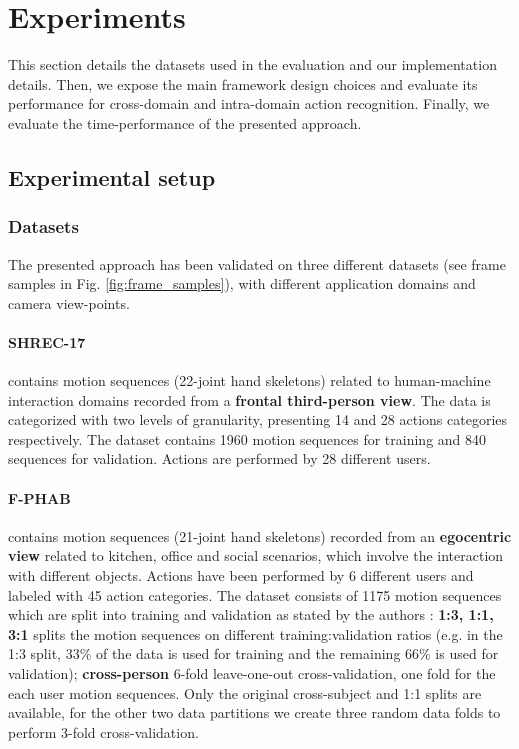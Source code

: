 \documentclass[letterpaper, 10 pt, conference]{ieeeconf}
\begin{document}
\section{Experiments}
This section details the datasets used in the evaluation and our implementation details.
Then, we expose the main framework design choices and evaluate its performance for cross-domain and intra-domain action recognition.
Finally, we evaluate the time-performance of the presented approach.

\subsection{Experimental setup}
\subsubsection{Datasets}\label{sec:datasets} The presented approach has been validated on three different datasets (see frame samples in Fig. \ref{fig:frame_samples}), with different application domains and camera view-points.


\paragraph*{SHREC-17 \cite{de2017shrec}} contains motion sequences (22-joint hand skeletons) related to human-machine interaction domains recorded from a \textbf{frontal third-person view}. The data is categorized with two levels of granularity, presenting 14 and 28 actions categories respectively. The dataset contains 1960 motion sequences for training and 840 sequences for validation. 
Actions are performed by 28 different users.

\paragraph*{F-PHAB \cite{garcia2018first}} contains motion sequences (21-joint hand skeletons) recorded from an \textbf{egocentric view} related to kitchen, office and social scenarios, which involve the interaction with different objects. 
Actions have been performed by 6 different users and labeled with 45 action categories.
The dataset consists of 1175 motion 
sequences which are split into training and validation as stated by the authors \cite{garcia2018first}:
    \textbf{1:3, 1:1, 3:1} splits the motion sequences on different training:validation ratios (e.g. in the 1:3 split, 33\% of the data is used for training and the remaining 66\% is used for validation);
    \textbf{cross-person} 6-fold leave-one-out cross-validation, one fold for the each user motion sequences.
Only the original cross-subject and 1:1 splits are available, for the other two data partitions we create three random data folds to perform 3-fold cross-validation.
\end{document}
